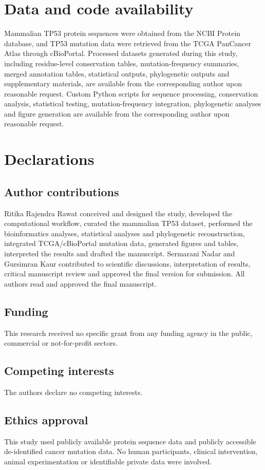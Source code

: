 \documentclass[namedate,webpdf,contemporary,large]{oup-authoring-template}
\begin{document}
\section{Data and code availability}
Mammalian TP53 protein sequences were obtained from the NCBI Protein database, and TP53 mutation data were retrieved from the TCGA PanCancer Atlas through cBioPortal. Processed datasets generated during this study, including residue-level conservation tables, mutation-frequency summaries, merged annotation tables, statistical outputs, phylogenetic outputs and supplementary materials, are available from the corresponding author upon reasonable request. Custom Python scripts for sequence processing, conservation analysis, statistical testing, mutation-frequency integration, phylogenetic analyses and figure generation are available from the corresponding author upon reasonable request.

\section{Declarations}
\subsection{Author contributions}
Ritika Rajendra Rawat conceived and designed the study, developed the computational workflow, curated the mammalian TP53 dataset, performed the bioinformatics analyses, statistical analyses and phylogenetic reconstruction, integrated TCGA/cBioPortal mutation data, generated figures and tables, interpreted the results and drafted the manuscript. Sermarani Nadar and Gursimran Kaur contributed to scientific discussions, interpretation of results, critical manuscript review and approved the final version for submission. All authors read and approved the final manuscript.

\subsection{Funding}
This research received no specific grant from any funding agency in the public, commercial or not-for-profit sectors.

\subsection{Competing interests}
The authors declare no competing interests.

\subsection{Ethics approval}
This study used publicly available protein sequence data and publicly accessible de-identified cancer mutation data. No human participants, clinical intervention, animal experimentation or identifiable private data were involved.
\end{document}
